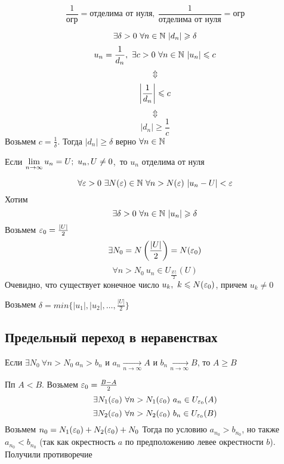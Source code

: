 \begin{theorem}
    $$ \frac{1}{\text{огр}} = \text{отделима от нуля},\ \frac{1}{\text{отделима от нуля}} = \text{огр} $$
\end{theorem}

\begin{Proof}
    $$ \exists \delta > 0\ \forall n \in \N\ |d_n| \geq \delta $$
    $$ u_n = \frac{1}{d_n},\ \exists c > 0\ \forall n \in \mathbb{N}\ |u_n| \leqslant c $$
    $$ \Updownarrow $$
    $$ \left|\frac{1}{d_n}\right| \leqslant c $$
    $$ \Updownarrow $$
    $$ |d_n| \geq \frac{1}{c} $$
    Возьмем $ c = \frac{1}{\delta} $. Тогда $ |d_n| \geq \delta $ верно $ \forall n \in \mathbb{N} $
\end{Proof}

\begin{theorem}
    Если $ \lim\limits_{n \to \infty} u_n = U;\ u_n, U \neq 0$,\ то $u_n$ отделима от нуля
\end{theorem}

\begin{Proof}
    $$ \forall \varepsilon > 0\ \exists N(\varepsilon) \in \mathbb{N}\ \forall n > N(\varepsilon)\ |u_n - U| < \varepsilon $$
    Хотим
    $$ \exists \delta > 0\ \forall n \in \mathbb{N}\ |u_n| \geqslant \delta $$
    Возьмем $ \varepsilon_0 = \frac{|U|}{2} $
    $$ \exists N_0 = N\left(\frac{|U|}{2}\right) = N(\varepsilon_0) $$
    $$ \forall n > N_0\ u_n \in U_{\frac{|U|}{2}}(U) $$
    Очевидно, что существует конечное число $u_k,\ k \leq N(\eps_0)$, причем $u_k \neq 0$

    Возьмем $\delta = min\{|u_1|, |u_2|, \ldots, \frac{|U|}{2}\}$
\end{Proof}

\subsection{Предельный переход в неравенствах}

\begin{theorem}
    Если $\exists N_0\ \forall n > N_0\ a_n > b_n$ и $a_n \underset{n \to \infty}{\to} A$ и $b_n \underset{n \to \infty}{\to} B$, то 
    $ A \geq B $
\end{theorem}

\begin{Proof}
    Пп $A < B$. Возьмем $\varepsilon_0 = \frac{B - A}{2} $
    $$ \exists N_1(\varepsilon_0)\ \forall n > N_1(\varepsilon_0)\ a_n \in U_{\varepsilon_0}(A) $$
    $$ \exists N_2(\eps_0)\ \forall n > N_2(\eps_0)\ b_n \in U_{\eps_0}(B) $$
    Возьмем $n_0 = N_1(\varepsilon_0) + N_2(\varepsilon_0) + N_0$
    Тогда по условию $a_{n_0} > b_{n_0}$, но также $a_{n_0} < b_{n_0}$ (так как окрестность $a$ по предположению левее окрестности $b$). Получили противоречие
\end{Proof}

